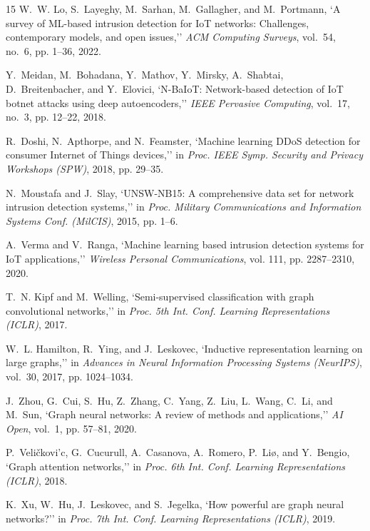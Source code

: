 \documentclass[conference]{IEEEtran}
\begin{document}
\begin{thebibliography}{15}
W.~W. Lo, S.~Layeghy, M.~Sarhan, M.~Gallagher, and M.~Portmann, `A survey of {ML}-based intrusion detection for {IoT} networks: Challenges, contemporary models, and open issues,'' \emph{ACM Computing Surveys}, vol.~54, no.~6, pp. 1--36, 2022.

Y.~Meidan, M.~Bohadana, Y.~Mathov, Y.~Mirsky, A.~Shabtai, D.~Breitenbacher, and Y.~Elovici, `{N-BaIoT}: Network-based detection of {IoT} botnet attacks using deep autoencoders,'' \emph{IEEE Pervasive Computing}, vol.~17, no.~3, pp. 12--22, 2018.

R.~Doshi, N.~Apthorpe, and N.~Feamster, `Machine learning {DDoS} detection for consumer {Internet of Things} devices,'' in \emph{Proc. IEEE Symp. Security and Privacy Workshops (SPW)}, 2018, pp. 29--35.

N.~Moustafa and J.~Slay, `{UNSW-NB15}: A comprehensive data set for network intrusion detection systems,'' in \emph{Proc. Military Communications and Information Systems Conf. (MilCIS)}, 2015, pp. 1--6.

A.~Verma and V.~Ranga, `Machine learning based intrusion detection systems for {IoT} applications,'' \emph{Wireless Personal Communications}, vol. 111, pp. 2287--2310, 2020.

T.~N. Kipf and M.~Welling, `Semi-supervised classification with graph convolutional networks,'' in \emph{Proc. 5th Int. Conf. Learning Representations (ICLR)}, 2017.

W.~L. Hamilton, R.~Ying, and J.~Leskovec, `Inductive representation learning on large graphs,'' in \emph{Advances in Neural Information Processing Systems (NeurIPS)}, vol.~30, 2017, pp. 1024--1034.

J.~Zhou, G.~Cui, S.~Hu, Z.~Zhang, C.~Yang, Z.~Liu, L.~Wang, C.~Li, and M.~Sun, `Graph neural networks: A review of methods and applications,'' \emph{AI Open}, vol.~1, pp. 57--81, 2020.

P.~Veli{\v{c}}kovi{'c}, G.~Cucurull, A.~Casanova, A.~Romero, P.~Li{\o}, and Y.~Bengio, `Graph attention networks,'' in \emph{Proc. 6th Int. Conf. Learning Representations (ICLR)}, 2018.

K.~Xu, W.~Hu, J.~Leskovec, and S.~Jegelka, `How powerful are graph neural networks?'' in \emph{Proc. 7th Int. Conf. Learning Representations (ICLR)}, 2019.


\end{thebibliography}
\end{document}
